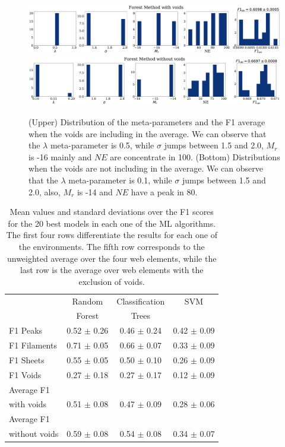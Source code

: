 \documentclass[usenatbib]{mnras}
\begin{document}
\begin{figure}
\centering
    \includegraphics[scale=0.23]{Figs/p_features_Forest_F1_av.pdf}
    \includegraphics[scale=0.23]{Figs/p_features_Forest_F1_av_no_voids.pdf}
    \caption{(Upper) Distribution of the meta-parameters and the F1 average
      when the voids are including in the average. We can observe that
      the $\lambda$ meta-parameter is 0.5, while $\sigma$
      jumps between 1.5 and 2.0, $M_r$ is -16 mainly and $NE$ are concentrate in 100.
      (Bottom) Distributions when the voids are not including in the average. We can observe that
      the $\lambda$ meta-parameter is 0.1, while $\sigma$
      jumps between 1.5 and 2.0, also, $M_r$ is -14 and $NE$ have a peak in 80.
      } 
    \label{fig:features_score}    
\end{figure}


\begin{table}
\centering
\begin{tabular}{p{1.8cm}ccc}
\hline
                  & Random               & Classification        & SVM\\
                  & Forest               & Trees                &  \\
\hline
 F1 Peaks               & 0.52 $\pm$ 0.26  & 0.46 $\pm$ 0.24 & 0.42 $\pm$ 0.09  \\
 F1 Filaments          & 0.71 $\pm$ 0.05 & 0.66 $\pm$ 0.07 & 0.33 $\pm$ 0.09 \\
 F1 Sheets             & 0.55 $\pm$ 0.05 & 0.50 $\pm$ 0.10 & 0.26 $\pm$ 0.09 \\
 F1 Voids              & 0.27 $\pm$ 0.18 & 0.27 $\pm$ 0.17 & 0.12 $\pm$ 0.09 \\
 Average F1\\ with voids    & 0.51 $\pm$ 0.08 & 0.47 $\pm$ 0.09 & 0.28 $\pm$ 0.06 \\
 Average F1\\ without voids & 0.59 $\pm$ 0.08 & 0.54 $\pm$ 0.08 & 0.34 $\pm$ 0.07 \\
\hline
\end{tabular}
\caption{Mean values and standard deviations over the F1
  scores for the 20 best models in each one of the ML algorithms.
  The first four rows differentiate the results for each one of the
  environments.
  The fifth row corresponds to the unweighted average over the four
  web elements, while the last row is the average over web elements
  with the exclusion of voids.}
\label{table:elements}
\end{table}
\end{document}
